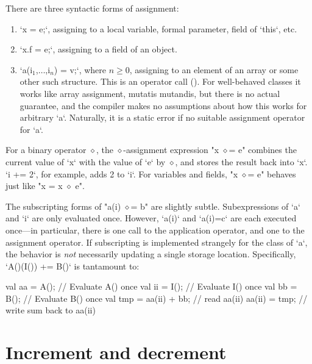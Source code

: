 There are three syntactic forms of
assignment: 
\begin{enumerate}
\item \xcd`x = e;`, assigning to a local variable, formal parameter, field of
      \xcd`this`, etc. 
\item \xcd`x.f = e;`, assigning to a field of an object.
\item \xcdmath`a(i$_1$,$\ldots$,i$_n$) = v;`, where {$n \ge 0$}, assigning to
      an element of an array or some other such structure. This is an operator
      call ().  For well-behaved classes it works like
      array assignment, mutatis mutandis, but there is no actual guarantee,
      and the compiler makes no assumptions about how this works for arbitrary \xcd`a`.
      Naturally, it is a static error if no suitable assignment operator
      for \xcd`a`.
\end{enumerate}

For a binary operator $\diamond$, the $\diamond$-assignment expression
\xcdmath"x $\diamond$= e" combines the current value of \xcd`x` with the value
of \xcd`e` by {$\diamond$}, and stores the result back into \xcd`x`.  
\xcd`i += 2`, for example, adds 2 to \xcd`i`. For variables and fields, 
\xcdmath"x $\diamond$= e" behaves just like \xcdmath"x = x $\diamond$ e". 

The subscripting forms of \xcdmath"a(i) $\diamond$= b" are slightly subtle.
Subexpressions of \xcd`a` and \xcd`i` are only evaluated once.  However,
\xcd`a(i)` and \xcd`a(i)=c` are each executed once---in particular, there is
one call to the application operator, and one to the assignment operator.
If subscripting is implemented strangely for
the class of \xcd`a`, the behavior is {\em not} necessarily updating a single
storage location. Specifically, \xcd`A()(I()) += B()` is tantamount to: 
\begin{xten}
{
  val aa = A();  // Evaluate A() once
  val ii = I();  // Evaluate I() once
  val bb = B();  // Evaluate B() once
  val tmp = aa(ii) + bb; // read aa(ii)
  aa(ii) = tmp;  // write sum back to aa(ii)
}
\end{xten}





\section{Increment and decrement}
\index{\Xcd{++}}
\index{\Xcd{--}}


